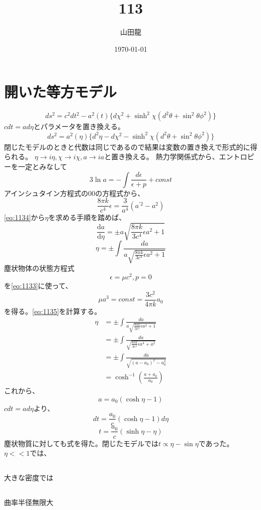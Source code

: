 \documentclass{jsarticle}
\date{\today}
\author{山田龍}
\title{113}
\newcommand{\dder}[2][]{\frac{\mathrm{d}#1}{\mathrm{d}#2}}
\newcommand{\beq}{\begin{equation}}
\newcommand{\eeq}{\end{equation}}
\begin{document}
\maketitle
\section{開いた等方モデル}
\beq
ds^2 = c^2 dt^2 - a^2(t)\{d\chi^2 + \sinh^2\chi(d^2\theta + \sin^2\theta\phi^2)\}
\eeq
$cdt = ad\eta$とパラメータを置き換える。
\beq
    ds^2 = a^2(\eta)\{d^2\eta - d\chi^2 - \sinh^2\chi(d^2\theta + \sin^2\theta\phi^2)\}
\eeq
閉じたモデルのときと代数は同じであるので結果は変数の置き換えで形式的に得られる。
$\eta \rightarrow i \eta, \chi \rightarrow i\chi, a \rightarrow ia$と置き換える。
熱力学関係式から、エントロピーを一定とみなして
\beq\label{eq:1133}
    3\ln a = - \int \frac{d\epsilon}{\epsilon + p} + const
\eeq
アインシュタイン方程式の$00$の方程式から、
\beq\label{eq:1134}
\frac{8\pi k}{c^4} \epsilon = \frac{3}{a^4}(a^{\prime 2} - a^2)
\eeq
\eqref{eq:1134}から$\eta$を求める手順を踏めば、
\beq
    \dder[a]{\eta} = \pm a\sqrt{\frac{8\pi k}{3c^4}\epsilon a^2+1}
\eeq
\beq
    \eta = \pm \int \frac{da}{a\sqrt{\frac{8\pi k}{3c^4}\epsilon a^2 + 1}}
\eeq
塵状物体の状態方程式
\beq\label{eq:1135}
    \epsilon = \mu c^2,p = 0
\eeq
を\eqref{eq:1133}に使って、
\beq
\mu a^3 = const = \frac{3c^2}{4\pi k}a_0
\eeq
を得る。\eqref{eq:1135}を計算する。
\begin{align}
    \eta &= \pm \int \frac{da}{a\sqrt{\frac{8\pi k}{3c^4}\epsilon a^2 + 1}}\\
         &= \pm \int \frac{da}{\sqrt{\frac{8\pi k}{3c^4}\epsilon a^4 + a^2}}\\
         &= \pm \int \frac{da}{\sqrt{(a - a_0)^2 - a_0^2}}\\
         &= \cosh^{-1}(\frac{a+a_0}{a_0})
\end{align}
これから、
\beq
    a = a_0(\cosh \eta - 1)
\eeq
$c dt = a d\eta$より、
\beq
    dt = \frac{a_0}{c}(\cosh\eta - 1)d\eta
\eeq
\beq
    t = \frac{a_0}{c}(\sinh \eta - \eta)
\eeq
塵状物質に対しても式を得た。閉じたモデルでは$t \propto \eta - \sin\eta$であった。
$\eta << 1$では、
\subsection{}
大きな密度では

\subsection{}
曲率半径無限大
\end{document}
